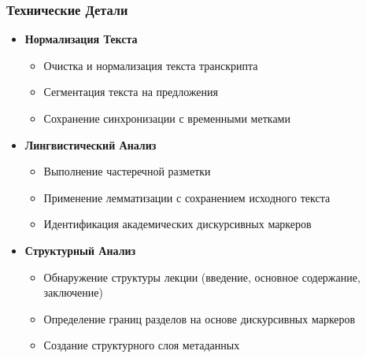 \documentclass[12pt,a4paper]{article}
\begin{document}
\subsubsection{Технические Детали}
\begin{itemize}
    \item \textbf{Нормализация Текста}
    \begin{itemize}
        \item Очистка и нормализация текста транскрипта
        \item Сегментация текста на предложения
        \item Сохранение синхронизации с временными метками
    \end{itemize}

    \item \textbf{Лингвистический Анализ}
    \begin{itemize}
        \item Выполнение частеречной разметки
        \item Применение лемматизации с сохранением исходного текста
        \item Идентификация академических дискурсивных маркеров
    \end{itemize}

    \item \textbf{Структурный Анализ}
    \begin{itemize}
        \item Обнаружение структуры лекции (введение, основное содержание, заключение)
        \item Определение границ разделов на основе дискурсивных маркеров
        \item Создание структурного слоя метаданных
    \end{itemize}
\end{itemize}
\end{document}

